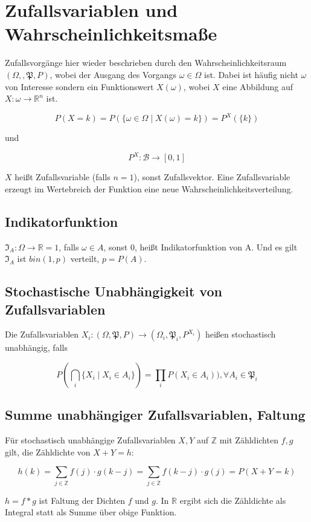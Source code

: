 \documentclass{scrartcl}%
\begin{document}
\section{Zufallsvariablen und Wahrscheinlichkeitsmaße}
Zufallsvorgänge hier wieder beschrieben durch den Wahrscheinlichkeitsraum $(\Omega,, \mathfrak{P}, P)$, wobei der Ausgang des Vorgangs $\omega \in \Omega$ ist. Dabei ist häufig nicht $\omega$ von Interesse sondern ein Funktionswert $X(\omega)$, wobei $X$ eine Abbildung auf $X: \omega \rightarrow \mathbb{R}^n$ ist.

\[P(X = k) = P(\{\omega \in \Omega \mid X(\omega) = k\}) = P^X (\{k\}) \]

und

\[P^X: \mathcal{B} \rightarrow [0,1]\]

$X$ heißt Zufallsvariable (falls $n = 1$), sonst Zufallsvektor. Eine Zufallsvariable erzeugt im Wertebreich der Funktion eine neue Wahrscheinlichkeitsverteilung.

\subsection{Indikatorfunktion}
$\mathfrak{I}_A: \Omega \rightarrow \mathbb{R} = 1$, falls $\omega \in A$, sonst $0$, heißt Indikatorfunktion von A. Und es gilt $\mathfrak{I}_A$ ist $bin(1,p)$ verteilt, $p = P(A)$.  

\subsection{Stochastische Unabhängigkeit von Zufallsvariablen}
Die Zufallsvariablen $X_i: (\Omega, \mathfrak{P},P) \rightarrow (\Omega_i, \mathfrak{P}_i, P^{X_i})$ heißen stochastisch unabhängig, falls

\[ P(\bigcap\limits_i \{X_i \mid X_i \in A_i\}) = \prod\limits_i P (X_i \in A_i)), \forall A_i \in \mathfrak{P}_i \]

\subsection{Summe unabhängiger Zufallsvariablen, Faltung}
Für stochastisch unabhängige Zufallsvariablen $X,Y$ auf $\mathbb{Z}$ mit Zähldichten $f,g$ gilt, die Zähldichte von $X+Y = h$:

\[h(k) = \sum\limits_{j \in \mathbb{Z}} f(j) \cdot g(k-j) = \sum\limits_{j \in \mathbb{Z}}f(k-j) \cdot g(j) = P(X+Y = k)\]

$h = f*g$ ist Faltung der Dichten $f$ und $g$. In $\mathbb{R}$ ergibt sich die Zähldichte als Integral statt als Summe über obige Funktion.
\end{document}
